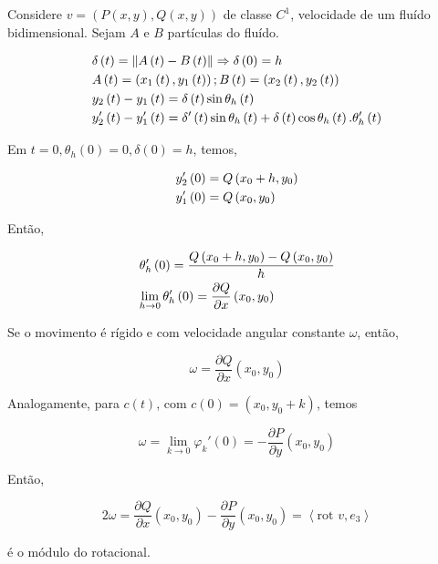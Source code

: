 \documentclass[11pt, oneside, a4paper]{gsm-l}
\begin{document}
\begin{exem}
Considere $v = \left( {P\left( {x,y} \right),Q\left( {x,y} \right)} \right)$ de classe $C^1$, velocidade de um fluído bidimensional. Sejam $A$ e $B$ partículas do fluído.
\end{exem}

\begin{sol}

\[
\begin{gathered}
  \delta \left( t \right) = \left\| {A\left( t \right) - B\left( t \right)} \right\| \Rightarrow \delta \left( 0 \right) = h \hfill \\
  A\left( t \right) = \left( {x_1 \left( t \right),y_1 \left( t \right)} \right);B\left( t \right) = \left( {x_2 \left( t \right),y_2 \left( t \right)} \right) \hfill \\
  y_2 \left( t \right) - y_1 \left( t \right) = \delta \left( t \right)\sin \theta _h \left( t \right) \hfill \\
  y_2 '\left( t \right) - y_1 '\left( t \right) = \delta '\left( t \right)\sin \theta _h \left( t \right) + \delta \left( t \right)\cos \theta _h \left( t \right).\theta _h '\left( t \right) \hfill \\
\end{gathered}
\]

Em $t = 0,\theta _h \left( 0 \right) = 0,\delta \left( 0 \right) = h$, temos,

\[
\begin{gathered}
  y_2 '\left( 0 \right) = Q\left( {x_0  + h,y_0 } \right) \hfill \\
  y_1 '\left( 0 \right) = Q\left( {x_0 ,y_0 } \right) \hfill \\
\end{gathered}
\]

Então,

\[
\begin{gathered}
  \theta _h '\left( 0 \right) = \frac{{Q\left( {x_0  + h,y_0 } \right) - Q\left( {x_0 ,y_0 } \right)}}
{h} \hfill \\
  \mathop {\lim }\limits_{h \to 0} \theta _h '\left( 0 \right) = \frac{{\partial Q}}
{{\partial x}}\left( {x_0 ,y_0 } \right) \hfill \\
\end{gathered}
\]

Se o movimento é rígido e com velocidade angular constante $\omega$, então,

\[
\omega  = \frac{{\partial Q}}{{\partial x}}\left( {x_0 ,y_0 } \right)
\]

Analogamente, para $c(t)$, com $c\left( 0 \right) = \left( {x_0 ,y_0  + k} \right)$, temos

\[
\omega  = \mathop {\lim }\limits_{k \to 0} \varphi _k '\left( 0 \right) =  - \frac{{\partial P}}
{{\partial y}}\left( {x_0 ,y_0 } \right)
\]

Então,

\[
2\omega  = \frac{{\partial Q}}
{{\partial x}}\left( {x_0 ,y_0 } \right) - \frac{{\partial P}}
{{\partial y}}\left( {x_0 ,y_0 } \right) = \left\langle {{\text{rot }}v,e_3 } \right\rangle
\]

é o m\'odulo do rotacional.
\end{sol}
\end{document}
